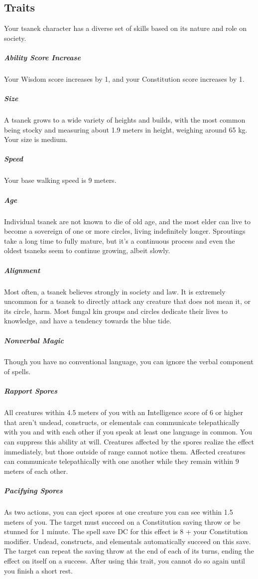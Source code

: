 \subsection*{Traits}
    Your tsanek character has a diverse set of skills based on its nature and role on society.

    \subparagraph{Ability Score Increase} Your Wisdom score increases by 1, and your Constitution score increases by 1.

    \subparagraph{Size} A tsanek grows to a wide variety of heights and builds, with the most common being stocky and measuring about 1.9 meters in height, weighing around 65 kg.
    Your size is medium.

    \subparagraph{Speed} Your base walking speed is 9 meters.

    \subparagraph{Age} Individual tsanek are not known to die of old age, and the most elder can live to become a sovereign of one or more circles, living indefinitely longer.
    Sproutings take a long time to fully mature, but it's a continuous process and even the oldest tsaneks seem to continue growing, albeit slowly.

    \subparagraph{Alignment} Most often, a tsanek believes strongly in society and law.
    It is extremely uncommon for a tsanek to directly attack any creature that does not mean it, or its circle, harm.
    Most fungal kin groups and circles dedicate their lives to knowledge, and have a tendency towards the blue tide.

    \subparagraph{Nonverbal Magic} Though you have no conventional language, you can ignore the verbal component of spells.

    \subparagraph{Rapport Spores} All creatures within 4.5 meters of you with an Intelligence score of 6 or higher that aren't undead, constructs, or elementals can communicate telepathically with you and with each other if you speak at least one language in common.
    You can suppress this ability at will.
    Creatures affected by the spores realize the effect immediately, but those outside of range cannot notice them.
    Affected creatures can communicate telepathically with one another while they remain within 9 meters of each other.

    \subparagraph{Pacifying Spores} As two actions, you can eject spores at one creature you can see within 1.5 meters of you.
    The target must succeed on a Constitution saving throw or be stunned for 1 minute.
    The spell save DC for this effect is 8 + your Constitution modifier.
    Undead, constructs, and elementals automatically succeed on this save.
    The target can repeat the saving throw at the end of each of its turns, ending the effect on itself on a success.
    After using this trait, you cannot do so again until you finish a short rest.


